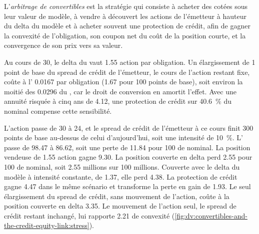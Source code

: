 \begin{definition}\label{def:dv:convertibles-and-the-credit-equity-link:arb}
L'\emph{arbitrage de convertibles} est la stratégie qui consiste à acheter des  cotées sous leur valeur de modèle,
à vendre à découvert les actions de l'émetteur à hauteur du delta du modèle et à acheter souvent une protection de crédit, afin de gagner la convexité de l'obligation, son coupon
net du coût de la position courte, et la convergence de son prix vers sa valeur.
\end{definition}

\begin{example}\label{ex:dv:convertibles-and-the-credit-equity-link:hedge}
Au cours de 30, le delta du  vaut 1.55 action par obligation. Un élargissement de 1 point de base du spread de crédit de l'émetteur, le cours de l'action restant fixe,
coûte à l' 0.0167 par obligation (1.67 pour 100 points de base), soit environ la moitié des 0.0296 du , car le droit de conversion
en amortit l'effet. Avec une annuité risquée à cinq ans de 4.12, une protection de crédit sur 40.6~\% du nominal compense cette sensibilité.
\end{example}

\begin{example}\label{ex:dv:convertibles-and-the-credit-equity-link:stress}
L'action passe de 30 à 24, et le spread de crédit de l'émetteur à ce cours finit 300 points de base au-dessus de celui d'aujourd'hui, soit une intensité de 10~\%. L' passe de
98.47 à 86.62, soit une perte de 11.84 pour 100 de nominal. La position vendeuse de 1.55 action gagne 9.30. La position couverte en delta perd 2.55 pour 100 de nominal, soit 2.55
millions sur 100 millions. Couverte avec le delta du modèle à intensité constante, de 1.37, elle perd 4.38. La protection de crédit gagne 4.47 dans le même
scénario et transforme la perte en gain de 1.93. Le seul élargissement du spread de crédit, sans mouvement de l'action, coûte à la position couverte en delta 3.35. Le mouvement de l'action
seul, le spread de crédit restant inchangé, lui rapporte 2.21 de convexité (\cref{fig:dv:convertibles-and-the-credit-equity-link:stress}).
\end{example}

